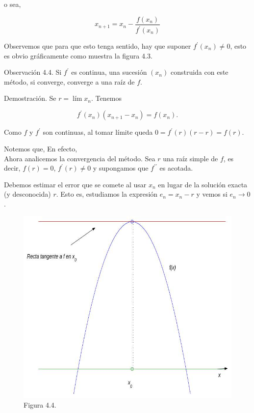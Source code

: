 \documentclass[10pt]{article}
\begin{document}
o sea,

$$
x_{n+1}=x_{n}-\frac{f\left(x_{n}\right)}{f^{\prime}\left(x_{n}\right)}
$$

Observemos que para que esto tenga sentido, hay que suponer $f^{\prime}\left(x_{n}\right) \neq 0$, esto es obvio gráficamente como muestra la figura 4.3.

Observación 4.4. Si $f^{\prime}$ es continua, una sucesión $\left(x_{n}\right)$ construida con este método, si converge, converge a una raíz de $f$.

Demostración. Se $r=\operatorname{lím} x_{n}$. Tenemos

$$
f^{\prime}\left(x_{n}\right)\left(x_{n+1}-x_{n}\right)=f\left(x_{n}\right) .
$$

Como $f$ y $f^{\prime}$ son continuas, al tomar límite queda $0=f^{\prime}(r)(r-r)=f(r)$.

Notemos que, En efecto,\\
Ahora analicemos la convergencia del método. Sea $r$ una raíz simple de $f$, es decir, $f(r)=0$, $f^{\prime}(r) \neq 0$ y supongamos que $f^{\prime \prime}$ es acotada.

Debemos estimar el error que se comete al usar $x_{n}$ en lugar de la solución exacta (y desconocida) $r$. Esto es, estudiamos la expresión $e_{n}=x_{n}-r$ y vemos si $e_{n} \rightarrow 0$.

\begin{figure}[h]
\begin{center}
  \includegraphics[width=\textwidth]{2025_09_05_3888c9ac96bd653d96b4g-075}
\captionsetup{labelformat=empty}
\caption{Figura 4.4.}
\end{center}
\end{figure}
\end{document}
